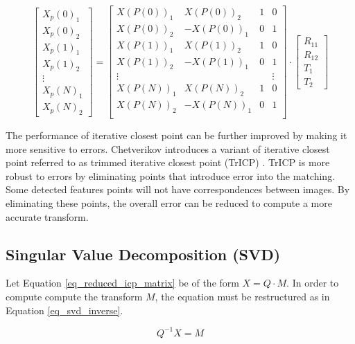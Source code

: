 \documentclass{article}
\begin{document}
\begin{equation}
\begin{bmatrix}
X_p(0)_1 \\
X_p(0)_2 \\
X_p(1)_1 \\
X_p(1)_2 \\
\vdots \\
X_p(N)_1 \\
X_p(N)_2
\end{bmatrix}
=
\begin{bmatrix}
X(P(0))_1 & X(P(0))_2 & 1 & 0 \\
X(P(0))_2 & -X(P(0))_1 & 0 & 1 \\
X(P(1))_1 & X(P(1))_2 & 1 & 0 \\
X(P(1))_2 & -X(P(1))_1 & 0 & 1 \\
\vdots & & & \vdots \\
X(P(N))_1 & X(P(N))_2 & 1 & 0 \\
X(P(N))_2 & -X(P(N))_1 & 0 & 1 \\
\end{bmatrix}
\cdot
\begin{bmatrix}
R_{11} \\
R_{12} \\
T_1 \\
T_2
\end{bmatrix}
\label{eq_reduced_icp_matrix}
\end{equation}

The performance of iterative closest point can be further improved by making it more sensitive to errors. Chetverikov introduces a variant of iterative closest point referred to as trimmed iterative closest point (TrICP) \cite{chetverikov_trimmed_2002}. TrICP is more robust to errors by eliminating points that introduce error into the matching. Some detected features points will not have correspondences between images. By eliminating these points, the overall error can be reduced to compute a more accurate transform.

\subsection{Singular Value Decomposition (SVD)}

Let Equation \ref{eq_reduced_icp_matrix} be of the form $X=Q \cdot M$. In order to compute compute the transform $M$, the equation must be restructured as in Equation \ref{eq_svd_inverse}.

\begin{equation}
Q^{-1} X = M
\label{eq_svd_inverse}
\end{equation}
\end{document}

